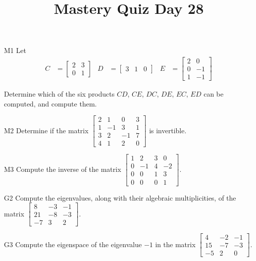 \documentclass{sbgLAquiz}
\title{Mastery Quiz Day 28 }
\begin{document}
\begin{problem}{M1}
Let
\begin{align*}
C &= \begin{bmatrix} 2 & 3 \\ 0 & 1 \end{bmatrix} & D&= \begin{bmatrix} 3 & 1 & 0 \end{bmatrix} & E&= \begin{bmatrix} 2 & 0 \\ 0 & -1 \\ 1 & -1 \end{bmatrix}
\end{align*}

Determine which of the six products $CD$, $CE$, $DC$, $DE$, $EC$, $ED$ can be computed, and compute them.
\end{problem}

\begin{problem}{M2}
Determine if the matrix $\begin{bmatrix} 2 & 1 & 0 & 3 \\ 1 & -1 & 3 & 1 \\ 3 & 2 & -1 & 7 \\ 4 & 1 & 2 & 0 \end{bmatrix}$ is invertible.
\end{problem}
\newpage

\begin{problem}{M3}
Compute the inverse of the matrix $\begin{bmatrix} 1 & 2 & 3 & 0 \\ 0 & -1 & 4 & -2 \\ 0 & 0 & 1 & 3 \\ 0 & 0 & 0 & 1 \end{bmatrix}$.
\end{problem}

\begin{problem}{G2}
Compute the eigenvalues, along with their algebraic multiplicities, of the matrix $ \begin{bmatrix} 8 & -3 & -1 \\ 21 & -8 & -3 \\ -7 & 3 & 2\end{bmatrix}$.
\end{problem}
\newpage

\begin{problem}{G3}
Compute the eigenspace of the eigenvalue $-1$ in the matrix $\begin{bmatrix} 4 & -2 & -1 \\ 15 & -7 & -3 \\ -5 & 2 & 0 \end{bmatrix}$.
\end{problem}
\end{document}
